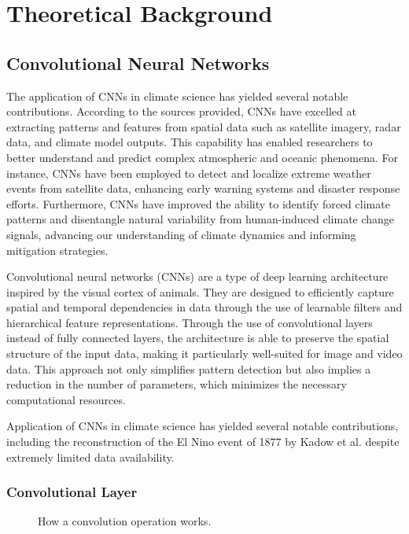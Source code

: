\section{Theoretical Background}
\label{sec:theory}

\subsection{Convolutional Neural Networks}
\label{subsec:cnn}

The application of CNNs in climate science has yielded several notable contributions. According to the sources provided, CNNs have excelled at extracting patterns and features from spatial data such as satellite imagery, radar data, and climate model outputs. This capability has enabled researchers to better understand and predict complex atmospheric and oceanic phenomena. For instance, CNNs have been employed to detect and localize extreme weather events from satellite data, enhancing early warning systems and disaster response efforts. Furthermore, CNNs have improved the ability to identify forced climate patterns and disentangle natural variability from human-induced climate change signals, advancing our understanding of climate dynamics and informing mitigation strategies.


Convolutional neural networks (CNNs) are a type of deep learning architecture inspired by the visual cortex of animals. They are designed to efficiently capture spatial and temporal dependencies in data through the use of learnable filters and hierarchical feature representations. Through the use of convolutional layers instead of fully connected layers, the architecture is able to preserve the spatial structure of the input data, making it particularly well-suited for image and video data. This approach not only simplifies pattern detection but also implies a reduction in the number of parameters, which minimizes the necessary computational resources.

Application of CNNs in climate science has yielded several notable contributions, including the reconstruction of the El Nino event of 1877 by Kadow et al. despite extremely limited data availability. \cite{kadow2020} 


\subsubsection*{Convolutional Layer}
\begin{figure}
    \centering
    \caption{How a convolution operation works. \cite{datahacker}}
    \label{fig:convolution_operation}
\end{figure}

